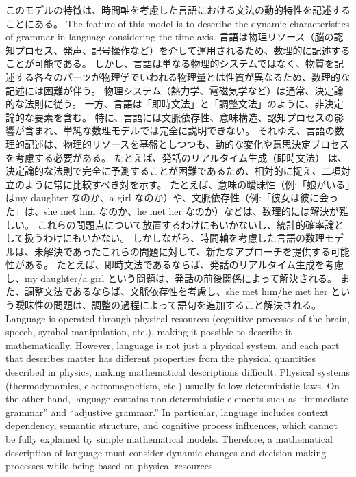 \documentclass[a4paper]{article}
\begin{document}
\ifJPN
このモデルの特徴は、時間軸を考慮した言語における文法の動的特性を記述することにある。
\else
The feature of this model is to describe the dynamic characteristics of grammar in language considering the time axis.
\fi
\ifJPN
言語は物理リソース（脳の認知プロセス、発声、記号操作など）を介して運用されるため、数理的に記述することが可能である。
しかし、言語は単なる物理的システムではなく、物質を記述する各々のパーツが物理学でいわれる物理量とは性質が異なるため、数理的な記述には困難が伴う。
物理システム（熱力学、電磁気学など）は通常、決定論的な法則に従う。
一方、言語は「即時文法」と「調整文法」のように、非決定論的な要素を含む。
特に、言語には文脈依存性、意味構造、認知プロセスの影響が含まれ、単純な数理モデルでは完全に説明できない。
それゆえ、言語の数理的記述は、物理的リソースを基盤としつつも、動的な変化や意思決定プロセスを考慮する必要がある。
たとえば、発話のリアルタイム生成（即時文法） は、決定論的な法則で完全に予測することが困難であるため、相対的に捉え、二項対立のように常に比較すべき対を示す。
たとえば、意味の曖昧性（例:「娘がいる」はmy daughter なのか、a girl なのか）や、文脈依存性（例:「彼女は彼に会った」は、she met him なのか、he met her なのか）などは、数理的には解決が難しい。
これらの問題点について放置するわけにもいかないし、統計的確率論として扱うわけにもいかない。
しかしながら、時間軸を考慮した言語の数理モデルは、未解決であったこれらの問題に対して、新たなアプローチを提供する可能性がある。
たとえば、即時文法であるならば、発話のリアルタイム生成を考慮し、my daughter/a girl という問題は、発話の前後関係によって解決される。
また、調整文法であるならば、文脈依存性を考慮し、she met him/he met her という曖昧性の問題は、調整の過程によって語句を追加すること解決される。
    \else
    Language is operated through physical resources (cognitive processes of the brain, speech, symbol manipulation, etc.), making it possible to describe it mathematically.
However, language is not just a physical system, and each part that describes matter has different properties from the physical quantities described in physics, making mathematical descriptions difficult.
Physical systems (thermodynamics, electromagnetism, etc.) usually follow deterministic laws.
On the other hand, language contains non-deterministic elements such as ``immediate grammar'' and ``adjustive grammar.''
In particular, language includes context dependency, semantic structure, and cognitive process influences, which cannot be fully explained by simple mathematical models.
Therefore, a mathematical description of language must consider dynamic changes and decision-making processes while being based on physical resources.
\end{document}
